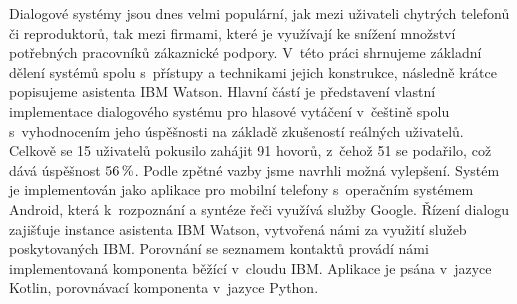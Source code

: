 \documentclass[12pt]{report}
\begin{document}

Dialogové systémy jsou dnes velmi populární, jak mezi uživateli chytrých
telefonů či reproduktorů, tak mezi firmami, které je využívají ke snížení
množství potřebných pracovníků zákaznické podpory. V~této práci
shrnujeme základní dělení systémů spolu s~přístupy a technikami
jejich konstrukce, následně krátce popisujeme asistenta IBM Watson.
Hlavní částí je představení vlastní implementace dialogového systému
pro hlasové vytáčení v~češtině spolu s~vyhodnocením jeho úspěšnosti
na základě zkušeností reálných uživatelů. Celkově se 15 uživatelů pokusilo
zahájit 91 hovorů, z~čehož 51 se podařilo, což dává úspěšnost \(56\,\rm \%\).
Podle zpětné vazby jsme navrhli možná vylepšení. Systém je implementován jako aplikace
pro mobilní telefony s~operačním systémem Android, která k~rozpoznání
a syntéze řeči využívá služby Google. Řízení dialogu zajišťuje instance asistenta
IBM Watson, vytvořená námi za využití služeb poskytovaných IBM.
Porovnání se seznamem kontaktů provádí námi implementovaná komponenta běžící
v~cloudu IBM. Aplikace je psána v~jazyce Kotlin, porovnávací komponenta
v~jazyce Python.
\end{document}
